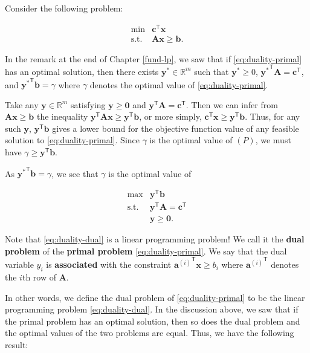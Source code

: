 \documentclass[]{book}
\newcommand{\RR}{\mathbb{R}}
\newcommand{\T}{\mathsf{T}}
\newcommand{\mm}[1]{\mathbf{#1}}
\renewcommand{\vec}[1]{\mathbf{#1}}
\theoremstyle{definition}
\theoremstyle{definition}
\theoremstyle{remark}
\begin{document}
Consider the following problem:

\begin{equation}
\begin{array}{rl}
\min & \vec{c}^\T\vec{x} \\
\mbox{s.t.} & \mm{A}\vec{x} \geq \vec{b}.
\label{eq:duality-primal}
\end{array}
\end{equation}

In the remark at the end of Chapter \ref{fund-lp}, we saw that if
\eqref{eq:duality-primal} has an optimal solution, then there exists
\(\vec{y}^*\in\RR^m\) such that \(\vec{y}^* \geq 0\),
\({\vec{y}^*}^\T\mm{A} = \vec{c}^\T\), and
\({\vec{y}^*}^\T\vec{b} = \gamma\) where \(\gamma\) denotes the optimal
value of \eqref{eq:duality-primal}.

Take any \(\vec{y}\in\RR^m\) satisfying \(\vec{y} \geq \vec{0}\) and
\(\vec{y}^\T\mm{A} = \vec{c}^\T\). Then we can infer from
\(\mm{A}\vec{x}\geq \vec{b}\) the inequality
\(\vec{y}^\T\mm{A}\vec{x} \geq \vec{y}^\T \vec{b}\), or more simply,
\(\vec{c}^\T\vec{x} \geq \vec{y}^\T \vec{b}\). Thus, for any such
\(\vec{y}\), \(\vec{y}^\T \vec{b}\) gives a lower bound for the
objective function value of any feasible solution to
\eqref{eq:duality-primal}. Since \(\gamma\) is the optimal value of
\((P)\), we must have \(\gamma \geq \vec{y}^\T\vec{b}\).

As \({\vec{y}^*}^\T\vec{b} = \gamma\), we see that \(\gamma\) is the
optimal value of

\begin{equation}
\begin{array}{rl}
\max & \vec{y}^\T\vec{b} \\
\mbox{s.t.} & \vec{y}^\T\mm{A} = \vec{c}^\T \\
&\vec{y} \geq \vec{0}.
\end{array}\label{eq:duality-dual}
\end{equation}

Note that \eqref{eq:duality-dual} is a linear programming problem! We call
it the \textbf{dual problem} of the \textbf{primal problem}
\eqref{eq:duality-primal}. We say that the dual variable \(y_i\) is
\textbf{associated} with the constraint
\({\vec{a}^{(i)}}^\T \vec{x} \geq b_i\) where \({\vec{a}^{(i)}}^\T\)
denotes the \(i\)th row of \(\mm{A}\).

In other words, we define the dual problem of \eqref{eq:duality-primal} to
be the linear programming problem \eqref{eq:duality-dual}. In the
discussion above, we saw that if the primal problem has an optimal
solution, then so does the dual problem and the optimal values of the
two problems are equal. Thus, we have the following result:
\end{document}
